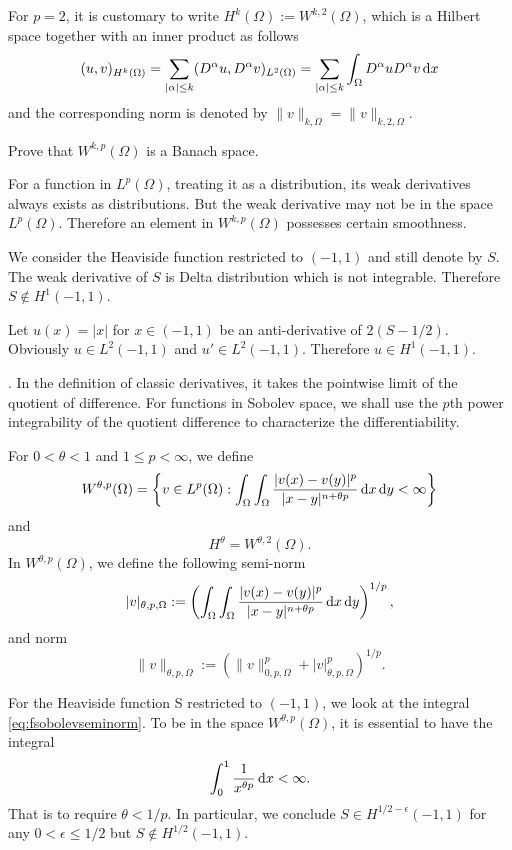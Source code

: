 For $p = 2$, it is customary to write
$H^k(\Omega) := W^{k,2}(\Omega)$, which is a Hilbert space
together with an inner product as follows
\[
(u, v)_{H^k(\Omega)} =\sum_{|\alpha|\leq k}(D^{\alpha}u, D^{\alpha}v)_{L^2(\Omega)}=\sum_{|\alpha|\leq k}\int_{\Omega}D^{\alpha}uD^{\alpha}v\,{\rm d}x
\]
and the corresponding norm is denoted by $\|v\|_{k, \Omega}=\|v\|_{k, 2, \Omega}$.

\begin{exe}
Prove that $W^{k,p}(\Omega)$ is a Banach space.
\end{exe}

For a function in $L^{p}(\Omega)$, treating it as a distribution, its weak derivatives always exists as distributions. But the weak derivative may not be in the space $L^{p}(\Omega)$. Therefore an element in $W^{k,p}(\Omega)$ possesses certain smoothness.

\begin{exm}
We consider the Heaviside function restricted to $(-1, 1)$ and still denote
by $S$. The weak derivative of $S$ is Delta distribution which is not integrable. Therefore $S \notin H^1(-1, 1)$.
\end{exm}

\begin{exm}
Let $u(x)=|x|$ for $x\in(-1,1)$ be an anti-derivative of $2(S-1/2)$. Obviously
$u\in L^2(-1, 1)$ and $u'\in L^2(-1, 1)$. Therefore $u\in H^1(-1, 1)$.
\end{exm}


\vskip0.5cm.
In the definition of classic derivatives, it takes the pointwise
limit of the quotient of difference. For functions in Sobolev space, we shall use the
$p$th power integrability of the quotient difference to characterize the differentiability.

For $0<\theta<1$ and $1\leq p<\infty$, we define
\[
W^{\theta, p}(\Omega)=\left\{v\in L^p(\Omega): \int_{\Omega}\int_{\Omega}\frac{|v(x)-v(y)|^p}{|x-y|^{n+\theta p}}\,{\rm d}x\,{\rm d} y<\infty\right\}
\]
and
\[
H^{\theta}=W^{\theta, 2}(\Omega).
\]
In $W^{\theta, p}(\Omega)$, we define the following semi-norm
\begin{equation}\label{eq:fsobolevseminorm}
|v|_{\theta,p,\Omega}:=\left(\int_{\Omega}\int_{\Omega}\frac{|v(x)-v(y)|^p}{|x-y|^{n+\theta p}}\,{\rm d}x\,{\rm d} y\right)^{1/p},
\end{equation}
and norm
\[
\|v\|_{\theta,p,\Omega}:=\left(\|v\|_{0,p,\Omega}^p+|v|_{\theta,p,\Omega}^p\right)^{1/p}.
\]

\begin{exm}
For the Heaviside function S restricted to $(-1, 1)$, we look at the integral \eqref{eq:fsobolevseminorm}. To be in the space $W^{\theta, p}(\Omega)$, it is essential
to have the integral
\[
\int_0^1\frac{1}{x^{\theta p}}\,{\rm d}x<\infty.
\]
That is to require $\theta < 1/p$. In particular, we conclude $S\in H^{1/2-\epsilon}(-1, 1)$ for any $0 <\epsilon\leq 1/2$ but $S\notin H^{1/2}(-1, 1)$.
\end{exm}


